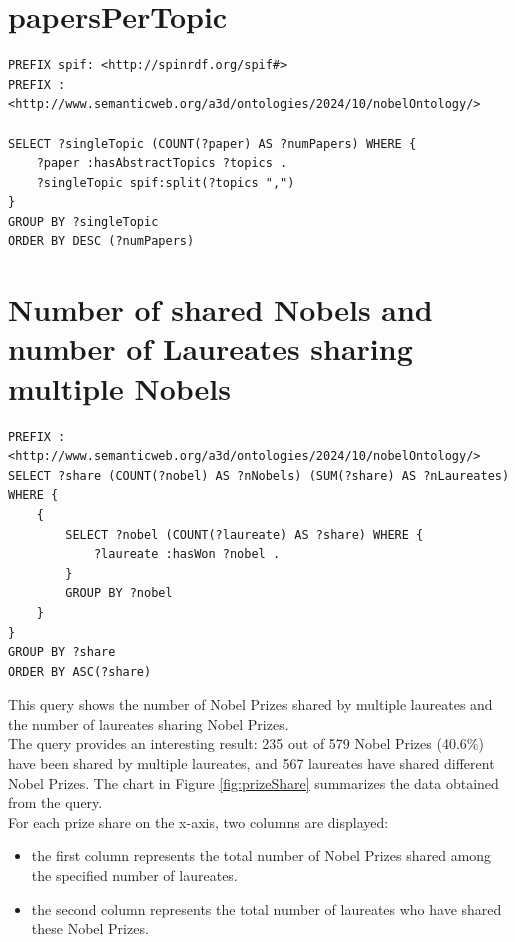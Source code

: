 \documentclass{article}
\begin{document}
\section{papersPerTopic}

\begin{lstlisting}
PREFIX spif: <http://spinrdf.org/spif#>
PREFIX : <http://www.semanticweb.org/a3d/ontologies/2024/10/nobelOntology/>

SELECT ?singleTopic (COUNT(?paper) AS ?numPapers) WHERE {
    ?paper :hasAbstractTopics ?topics .
    ?singleTopic spif:split(?topics ",")
}
GROUP BY ?singleTopic
ORDER BY DESC (?numPapers)
\end{lstlisting}

\section{Number of shared Nobels and number of Laureates sharing multiple Nobels}

\begin{lstlisting}
PREFIX : <http://www.semanticweb.org/a3d/ontologies/2024/10/nobelOntology/>
SELECT ?share (COUNT(?nobel) AS ?nNobels) (SUM(?share) AS ?nLaureates) WHERE {
    {
        SELECT ?nobel (COUNT(?laureate) AS ?share) WHERE {
            ?laureate :hasWon ?nobel .
        }
        GROUP BY ?nobel
    }
}
GROUP BY ?share
ORDER BY ASC(?share)
\end{lstlisting}

This query shows the number of Nobel Prizes shared by multiple laureates
and the number of laureates sharing Nobel Prizes.\\
The query provides an interesting result: 235 out of 579 Nobel Prizes (40.6\%) have
been shared by multiple laureates, and 567 laureates have shared different Nobel Prizes.
The chart in Figure \ref{fig:prizeShare} summarizes the data obtained from the query.\\
For each prize share on the x-axis, two columns are displayed:
\begin{itemize}
	\item the first column represents the total number of Nobel Prizes shared among the specified number of laureates.
	\item the second column represents the total number of laureates who have shared these Nobel Prizes.
\end{itemize}
\end{document}
